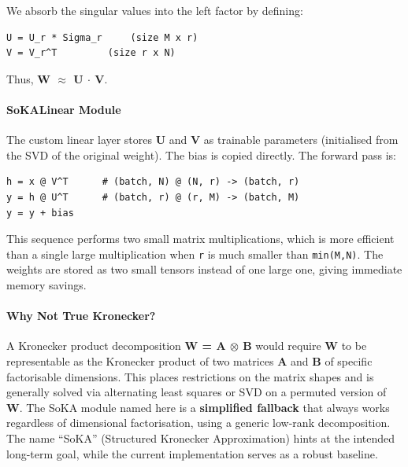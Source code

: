 We absorb the singular values into the left factor by defining:

\vspace{0.5em}
\begin{mdframed}[backgroundcolor=codebg, linecolor=codeframe, linewidth=1pt, roundcorner=4pt, innerleftmargin=2pt, innerrightmargin=5pt, innertopmargin=5pt, innerbottommargin=5pt]
\begin{lstlisting}
U = U_r * Sigma_r     (size M x r)
V = V_r^T         (size r x N)
\end{lstlisting}
\end{mdframed}
\vspace{0.5em}

Thus, \textbf{W $\approx$ U $\cdot$ V}.

\paragraph{SoKALinear Module}

The custom linear layer stores \textbf{U} and \textbf{V} as trainable parameters (initialised from the SVD of the original weight). The bias is copied directly. The forward pass is:

\vspace{0.5em}
\begin{mdframed}[backgroundcolor=codebg, linecolor=codeframe, linewidth=1pt, roundcorner=4pt, innerleftmargin=2pt, innerrightmargin=5pt, innertopmargin=5pt, innerbottommargin=5pt]
\begin{lstlisting}
h = x @ V^T      # (batch, N) @ (N, r) -> (batch, r)
y = h @ U^T      # (batch, r) @ (r, M) -> (batch, M)
y = y + bias
\end{lstlisting}
\end{mdframed}
\vspace{0.5em}

This sequence performs two small matrix multiplications, which is more efficient than a single large multiplication when \texttt{r} is much smaller than \texttt{min(M,N)}. The weights are stored as two small tensors instead of one large one, giving immediate memory savings.

\paragraph{Why Not True Kronecker?}

A Kronecker product decomposition \textbf{W = A $\otimes$ B} would require \textbf{W} to be representable as the Kronecker product of two matrices \textbf{A} and \textbf{B} of specific factorisable dimensions. This places restrictions on the matrix shapes and is generally solved via alternating least squares or SVD on a permuted version of \textbf{W}. The SoKA module named here is a \textbf{simplified fallback} that always works regardless of dimensional factorisation, using a generic low-rank decomposition. The name ``SoKA'' (Structured Kronecker Approximation) hints at the intended long-term goal, while the current implementation serves as a robust baseline.


